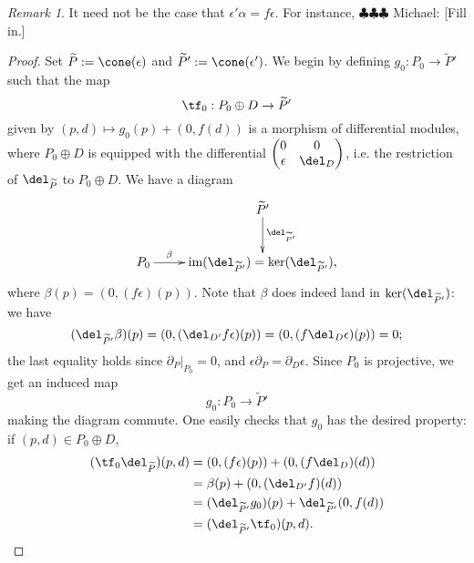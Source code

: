 \documentclass[12pt]{amsart}
\theoremstyle{definition}
\theoremstyle{remark}
\newtheorem{rem}[lemma]{Remark}
\newcommand{\im}{\operatorname{im}}
\newcommand{\michael}[1]{{\color{red} \sf $\clubsuit\clubsuit\clubsuit$ Michael: [#1]}}
\def\a{\alpha}
\def\tP{\widetilde{P}}
\begin{document}
\begin{rem}
It need not be the case that $\epsilon' \a = f \epsilon$. For instance, \michael{Fill in.}
\end{rem}


\begin{proof}
Set $\tP := \cone(\epsilon)$ and $\tP':= \cone(\epsilon')$. We begin by defining $g_0 : P_0 \to \tP'$ such that the map
$$
\tf_0 : P_0 \oplus D \to \tP'
$$
given by $(p, d) \mapsto g_0(p) + (0, f(d))$ is a morphism of differential modules, where $P_0 \oplus D$ is equipped with the differential $\begin{pmatrix} 0 & 0 \\ \epsilon & \del_D \end{pmatrix}$, i.e. the restriction of $\del_{\tP}$ to $P_0 \oplus D$. We have a diagram 
$$
\xymatrix{
& \tP' \ar[d]^-{\del_{\tP'}} \\
P_0 \ar[r]^-{\beta} & \im(\del_{\tP'}) = \ker(\del_{\tP'}),
}
$$
where $\beta(p) = (0, (f  \epsilon)(p))$. Note that $\beta$ does indeed land in $\ker(\del_{\tP'})$: we have
$$
(\del_{\tP'}  \beta)(p) = (0, (\del_{D'}  f  \epsilon)(p)) = (0, (f  \del_{D}  \epsilon)(p)) = 0;
$$
the last equality holds since $\partial_{P}|_{P_0} = 0$, and $\epsilon \partial_P = \partial_D \epsilon$. Since $P_0$ is projective, we get an induced map
$$
g_0 : P_0 \to \tP'
$$
making the diagram commute. One easily checks that $g_0$ has the desired property: if $(p,d) \in P_0 \oplus D$,
\begin{align*}
(\tf_0  \del_{\tP})(p, d) & = (0, (f  \epsilon)(p) )+ (0, (f  \del_D)(d)) \\
&=  \beta(p) +(0,  (\del_{D'}  f)(d)) \\
&= (\del_{\tP'}  g_0)(p) + \del_{\tP'}(0, f(d)) \\
&= (\del_{\tP'}  \tf_0)(p, d).
\end{align*}


\end{proof}
\end{document}
